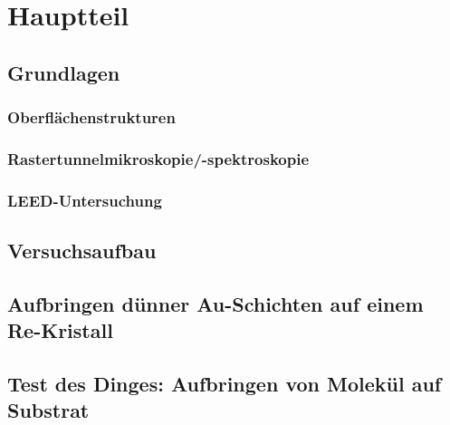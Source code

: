 \documentclass[a4paper,11pt,oneside,final,german,openbib,pdftex]{scrbook}
\begin{document}
\chapter{Hauptteil}




\section{Grundlagen}

\subsection{Oberflächenstrukturen}

\subsection{Rastertunnelmikroskopie/-spektroskopie}
\subsection{LEED-Untersuchung}



\section{Versuchsaufbau} 

 
\section{Aufbringen dünner Au-Schichten auf einem Re-Kristall}




\section{Test des Dinges: Aufbringen von Molekül auf Substrat} \label{kaptest}




\end{document}
